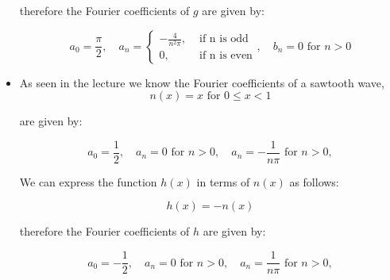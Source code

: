 \documentclass[11pt]{article}
\begin{document}
\begin{solution}
\begin{itemize}
    therefore the Fourier coefficients of $g$ are given by:

    $$
    a_0 = \frac{\pi}{2}, \quad a_n = \begin{cases}-\frac{4}{n^2\pi}, & \text { if n is odd} \\ 0, & \text{ if n is even}\end{cases}, \quad b_n = 0 \text{ for } n > 0
    $$
    \item As seen in the lecture we know the Fourier coefficients of a sawtooth wave,
    $$
    n(x)=x \text { for } 0 \leq x<1
    $$

    are given by:

    $$
    a_0 = \frac{1}{2}, \quad a_n = 0 \text{ for } n > 0,  \quad a_n = -\frac{1}{n\pi} \text{ for } n > 0,
    $$

    We can express the function $h(x)$ in terms of $n(x)$ as follows:

    $$
    h(x) = -n(x)
    $$

    therefore the Fourier coefficients of $h$ are given by:

    $$
    a_0 = -\frac{1}{2}, \quad a_n = 0 \text{ for } n > 0,  \quad a_n = \frac{1}{n\pi} \text{ for } n > 0,
    $$
    \end{itemize}
\end{solution}
\end{document}
